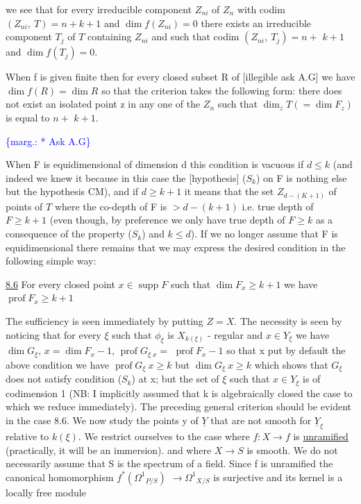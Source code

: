 \documentclass[11pt]{article}
\newcommand{\scanpage}[1]{\par\bigskip\noindent{\small\sffamily[scan #1]}\par}
\newcommand{\mspage}[1]{{\small\sffamily[p.\,#1]}}
\newcommand{\margin}[1]{\textcolor{blue}{\{\textsf{marg.:} #1\}}}
\newcommand{\uline}[1]{\underline{#1}}
\begin{document}

we see that for every irreducible component $Z_{ni}$ of $Z_n$ with codim
$(Z_{ni},\ T) = n + k + 1$ and $\dim f(Z_{ni}) = 0$ there exists an irreducible
component $T_j$ of $T$ containing $Z_{ni}$ and such that codim $(Z_{ni},\ T_j) = n +$
$k + 1$ and $\dim f(T_j) = 0$.

When f is given finite then for every closed subset R of
[illegible ask A.G] we have $\dim f(R) = \dim R$ so that the criterion
takes the following form: there does not exist an isolated point
z in any one of the $Z_n$ such that $\dim_z T( = \dim F_z)$ is equal to $n +$
$k + 1$.

\margin{* Ask A.G}

\clearpage
\scanpage{24/42}
\mspage{42}

When F is equidimensional of dimension d this condition is vacuous
if $d \leq k$ (and indeed we knew it because in this case the
[hypothesis] ($S_k$) on F is nothing else but the hypothesis CM), and
if $d \geq k + 1$ it means that the set $Z_{d-(K + 1)}$ of points of $T$ where
the co-depth of F is $> d - (k + 1)$ i.e. true depth of $F \geq k + 1$
(even though, by preference we only have true depth of $F \geq k$ as a
consequence of the property ($S_k$) and $k \leq d$). If we no longer
assume that F is equidimensional there remains that we may express
the desired condition in the following simple way:

\uline{8.6} For every closed point $x \in \operatorname{supp} F$ such that $\dim F_x \geq k + 1$ we
have $\operatorname{prof} F_x \geq k + 1$

The sufficiency is seen immediately by putting $Z = X$. The
necessity is seen by noticing that for every $\xi$ such that $\phi_\xi$ is $X_{k(\xi)}$
- regular and $x \in Y_\xi$ we have $\dim G_\xi$, $x = \dim F_x - 1$, $\operatorname{prof} G_{\xi\; x} =$
$\operatorname{prof} F_x - 1$ so that x put by default the above condition we have
$\operatorname{prof} G_\xi\ x \geq k$ but $\dim G_\xi\ x \geq k$ which shows that $G_\xi$ does not satisfy
condition ($S_k$) at x; but the set of $\xi$ such that $x \in Y_\xi$ is of
codimension 1 (NB: I implicitly assumed that k is algebraically
closed the case to which we reduce immediately). The preceding
general criterion should be evident in the case 8.6. We now study
the points y of $\underline{Y}$ that are not smooth for $\underline{Y}_\xi$ relative to $k(\xi)$. We
restrict ourselves to the case where $f\colon X \to f$ is \uline{unramified}
(practically, it will be an immersion). and where $X \to S$ is
smooth. We do not necessarily assume that S is the spectrum of a
field. Since f is unramified the canonical homomorphism $f^*(\Omega^1{}_{\underline{P}/S})$
$\to \Omega^1{}_{X/S}$ is surjective and its kernel is a locally free module
\end{document}
